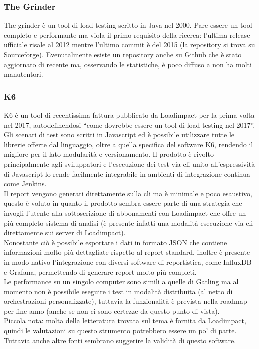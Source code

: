 \subsubsection{The Grinder}
The grinder è un tool di load testing scritto in Java nel 2000. Pare essere un tool completo e performante ma viola il primo requisito della ricerca: l’ultima release ufficiale risale al 2012 mentre l’ultimo commit è del 2015 (la repository si trova su Sourceforge).
Evenutalmente esiste un repository anche su Github che è stato aggiornato di recente ma, osservando le statistiche, è poco diffuso a non ha molti manutentori.
\subsubsection{K6}
K6 è un tool di recentissima fattura pubblicato da Loadimpact per la prima volta nel 2017, autodefinendosi “come dovrebbe essere un tool di load testing nel 2017”. \\
Gli scenari di test sono scritti in Javascript ed è possibile utilizzare tutte le librerie offerte dal linguaggio, oltre a quella specifica del software K6, rendendo il migliore per il lato modularità e versionamento. Il prodotto è rivolto principalmente agli sviluppatori e l’esecuzione dei test via \gls{cli} unito all'espressività di Javascript lo rende facilmente integrabile in ambienti di \gls{integrazione-continua} come Jenkins. \\
Il report vengono generati direttamente sulla \gls{cli} ma è minimale e poco esaustivo, questo è voluto in quanto il prodotto sembra essere parte di una strategia che invogli l’utente alla sottoscrizione di abbonamenti con Loadimpact che offre un più completo sistema di analisi (è presente infatti una modalità esecuzione via \gls{cli} direttamente sui server di Loadimpact). \\
Nonostante ciò è possibile esportare i dati in formato JSON che contiene informazioni molto più dettagliate rispetto al report standard, inoltre è presente in modo nativo l'integrazione con diversi software di reportistica, come InfluxDB e Grafana, permettendo di generare report molto più completi.\\
Le performance su un singolo computer sono simili a quelle di Gatling ma al momento non è possibile eseguire i test in modalità distribuita (al netto di orchestrazioni personalizzate), tuttavia la funzionalità è prevista nella roadmap per fine anno (anche se non ci sono certezze da questo punto di vista). \\
Piccola nota: molta della letteratura trovata sul tema è fornita da Loadimpact, quindi le valutazioni su questo strumento potrebbero essere un po’ di parte. Tuttavia anche altre fonti sembrano suggerire la validità di questo software.

